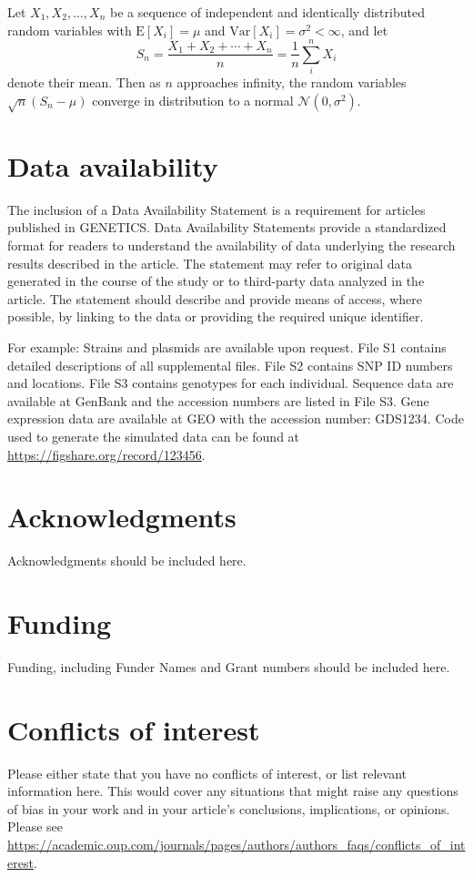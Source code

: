 \documentclass[9pt,twocolumn,twoside,lineno]{gsajnl}
\begin{document}
Let $X_1, X_2, \ldots, X_n$ be a sequence of independent and identically distributed random variables with $\text{E}[X_i] = \mu$ and $\text{Var}[X_i] = \sigma^2 < \infty$, and let
\begin{equation}
S_n = \frac{X_1 + X_2 + \cdots + X_n}{n}
      = \frac{1}{n}\sum_{i}^{n} X_i
\label{eq:refname1}
\end{equation}
denote their mean. Then as $n$ approaches infinity, the random variables $\sqrt{n}(S_n - \mu)$ converge in distribution to a normal $\mathcal{N}(0, \sigma^2)$.

\section{Data availability}

The inclusion of a Data Availability Statement is a requirement for articles published in GENETICS. Data Availability Statements provide a standardized format for readers to understand the availability of data underlying the research results described in the article. The statement may refer to original data generated in the course of the study or to third-party data analyzed in the article. The statement should describe and provide means of access, where possible, by linking to the data or providing the required unique identifier.

For example: Strains and plasmids are available upon request. File S1 contains detailed descriptions of all supplemental files. File S2 contains SNP ID numbers and locations. File S3 contains genotypes for each individual. Sequence data are available at GenBank and the accession numbers are listed in File S3. Gene expression data are available at GEO with the accession number: GDS1234. Code used to generate the simulated data can be found at \url{https://figshare.org/record/123456}.

\section{Acknowledgments}
Acknowledgments should be included here.

\section{Funding}
Funding, including Funder Names and Grant numbers should be included here.

\section{Conflicts of interest}
Please either state that you have no conflicts of interest, or list relevant information here.  This would cover any situations that might raise any questions of bias in your work and in your article’s conclusions, implications, or opinions. Please see \url{https://academic.oup.com/journals/pages/authors/authors_faqs/conflicts_of_interest}.


\end{document}

